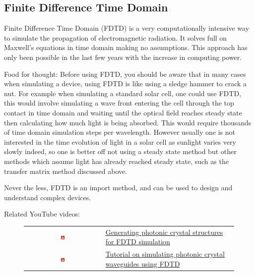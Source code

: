 \subsection{Finite Difference Time Domain}
Finite Difference Time Domain (FDTD) is a very computationally intensive way to simulate the propagation of electromagnetic radiation.  It solves full on Maxwell's equations in time domain making no assumptions.  This approach has only been possible in the last few years with the increase in computing power.

Food for thought: Before using FDTD, you should be aware that in many cases when simulating a device, using FDTD is like using a sledge hammer to crack a nut.  For example when simulating a standard solar cell, one could use FDTD, this would involve simulating a wave front entering the cell through the top contact in time domain and waiting until the optical field reaches steady state then calculating how much light is being absorbed. This would require thousands of time domain simulation steps per wavelength.  However usually one is not interested in the time evolution of light in a solar cell as sunlight varies very slowly indeed, so one is better off not using a steady state method but other methods which assume light has already reached steady state, such as the transfer matrix method discussed above.

Never the less, FDTD is an import method, and can be used to design and understand complex devices.

Related YouTube videos:
\begin{figure}[H]

\begin{tabular}{ c l }

\includegraphics[width=0.05\textwidth]{./images/youtube.png}

&
\href{https://www.youtube.com/watch?v=il4Asw4-yQQ}{Generating photonic crystal structures for FDTD simulation}\
\\
\includegraphics[width=0.05\textwidth]{./images/youtube.png}

&
\href{https://www.youtube.com/watch?v=cnd5VRK56YM}{Tutorial on simulating photonic crystal waveguides using FDTD}

\end{tabular}
\end{figure}




